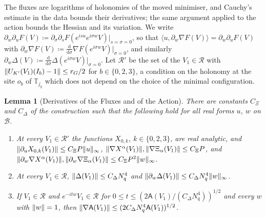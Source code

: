 \documentclass[11pt]{preprint}
\newcommand{\dd}{\mathrm{d}}
\DeclarePairedDelimiter{\norm}{\lVert}{\rVert}
\numberwithin{equation}{section}
\newtheorem{lemma}[theorem]{Lemma}
\theoremstyle{definition}
\theoremstyle{remark}
\theoremstyle{plain}
\begin{document}
The fluxes are logarithms of holonomies of the moved minimiser, and Cauchy's estimate in the data bounds their derivatives; the same argument applied to the action bounds the Hessian and its variation. We write $\partial_w\partial_uF(V) \coloneqq \partial_\sigma\partial_sF(e^{isu}e^{i\sigma w}V)|_{s=\sigma=0}$, so that $\langle u, \partial_w\nabla F(V)\rangle = \partial_w\partial_uF(V)$ with $\partial_w\nabla F(V) \coloneqq \frac{\dd}{\dd\sigma}\nabla F(e^{i\sigma w}V)|_{\sigma=0}$, and similarly $\partial_w\Delta(V) \coloneqq \frac{\dd}{\dd\sigma}\Delta(e^{i\sigma w}V)|_{\sigma=0}$. Let $\mathcal R'$ be the set of the $V_1 \in \mathcal R$ with $\norm{U_{K'}(V_1)(I_b) - 1} \leq r_G/2$ for $b \in \{ 0, 2, 3 \}$, a condition on the holonomy at the site $o_b$ of $\mathbb T_{j_q}$ which does not depend on the choice of the minimal configuration.

\begin{lemma}[Derivatives of the Fluxes and of the Action]\label{lem:flux-derivatives}
There are constants $C_\Xi$ and $C_\Delta$ of the construction such that the following hold for all real forms $u$, $w$ on $\mathcal B$.
\begin{enumerate}[label=(\roman*)]
\item At every $V_1 \in \mathcal R'$ the functions $X_{0,k}$, $k \in \{ 0, 2, 3 \}$, are real analytic, and $\norm{\partial_uX_{0,k}(V_1)} \leq C_\Xi P\norm u_\infty$, $\norm{\nabla X^\alpha(V_1)}, \norm{\nabla\Xi_\alpha(V_1)} \leq C_\Xi P$, and $\norm{\partial_w\nabla X^\alpha(V_1)}, \norm{\partial_w\nabla\Xi_\alpha(V_1)} \leq C_\Xi P^2\norm w_\infty$.
\item At every $V_1 \in \mathcal R$, $\norm{\Delta(V_1)} \leq C_\Delta N_q^4$ and $\norm{\partial_w\Delta(V_1)} \leq C_\Delta N_q^4\norm w_\infty$.
\item If $V_1 \in \mathcal R$ and $e^{-itw}V_1 \in \mathcal R$ for $0 \leq t \leq (2\mathsf A(V_1)/(C_\Delta N_q^4))^{1/2}$ and every $w$ with $\norm w = 1$, then $\norm{\nabla\mathsf A(V_1)} \leq (2C_\Delta N_q^4\mathsf A(V_1))^{1/2}$.
\end{enumerate}
\end{lemma}
\end{document}
